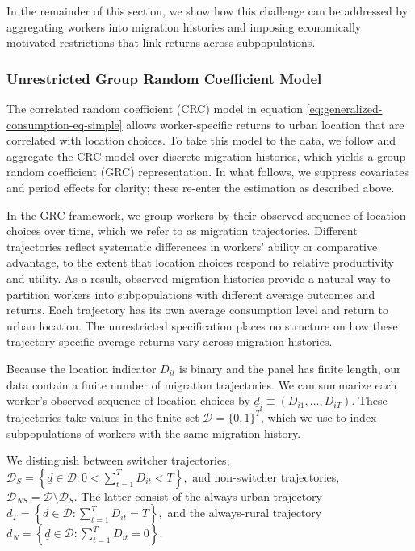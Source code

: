 \documentclass[12pt]{article}
\begin{document}
In the remainder of this section, we show how this challenge can be addressed by aggregating workers into migration histories and imposing economically motivated restrictions that link returns across subpopulations.


\subsubsection{Unrestricted Group Random Coefficient Model}\label{subsec:unrestricted-grc-model}
The correlated random coefficient (CRC) model in equation \eqref{eq:generalized-consumption-eq-simple} allows worker-specific returns to urban location that are correlated with location choices. 
To take this model to the data, we follow \cite{tjernstromCommentSuri2011} and aggregate the CRC model over discrete migration histories, which yields a  group random coefficient (GRC) representation.
In what follows, we suppress covariates and period effects for clarity; these re-enter the estimation as described above. 

In the GRC framework, we group workers by their observed sequence of location choices over time, which we refer to as migration trajectories.
Different trajectories reflect systematic differences in workers' ability or comparative advantage, to the extent that location choices respond to relative productivity and utility.
As a result, observed migration histories provide a natural way to partition workers into subpopulations with different average outcomes and returns.
Each trajectory has its own average consumption level and return to urban location.
The unrestricted specification places no structure on how these trajectory-specific average returns vary across migration histories.

Because the location indicator $D_{it}$ is binary and the panel has finite length, our data contain a finite number of migration trajectories.
We can summarize each worker's observed sequence of location choices by $\underline d_i\equiv(D_{i1},\dots,D_{iT})$.
These trajectories take values in the finite set $\mathcal D=\{0,1\}^T$, which we use to index subpopulations of workers with the same migration history.

We distinguish between switcher trajectories,
$\mathcal D_S = \left\{ \underline d \in \mathcal D : 0 < \sum_{t=1}^T D_{it} < T \right\},$
and non-switcher trajectories,
$\mathcal D_{NS} = \mathcal D \setminus \mathcal D_S.$
The latter consist of the always-urban trajectory
$d_T = \left\{ \underline d \in \mathcal D : \sum_{t=1}^T D_{it} = T \right\},$ and the always-rural trajectory
$d_N = \left\{ \underline d \in \mathcal D : \sum_{t=1}^T D_{it} = 0 \right\}.$
\end{document}
